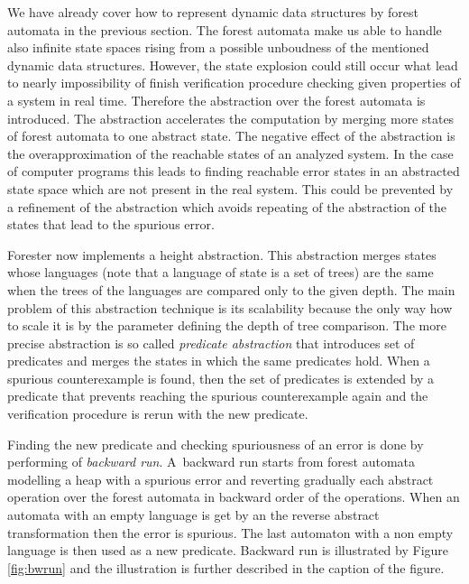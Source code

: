 \documentclass[fleqn,11pt]{ExcelAtFIT} %
\begin{document}
We have already cover how to represent dynamic data structures by forest automata in the previous section.
The forest automata make us able to handle also infinite state spaces
rising from a possible unboudness of the mentioned dynamic data structures.
However, the state explosion could still occur what lead
to nearly impossibility of finish verification procedure checking given properties of a system in real time.
Therefore the abstraction over the forest automata is introduced.
The abstraction accelerates the computation by merging more states
of forest automata to one abstract state.
The negative effect of the abstraction is the overapproximation of the reachable
states of an analyzed system.
In the case of computer programs this leads to finding reachable error states in
an abstracted state space which are not present in the real system.
This could be prevented by a refinement of the abstraction
which avoids repeating of the abstraction of the states
that lead to the spurious error.

Forester now implements a height abstraction.
This abstraction merges states whose languages (note that a language of state is a set of trees) are the same
when the trees of the languages are compared only to the given depth.
The main problem of this abstraction technique is its scalability because
the only way how to scale it is by the parameter defining the depth of tree comparison.
The more precise abstraction is so called \emph{predicate abstraction} that introduces
set of predicates and merges the states in which the same predicates hold.
When a spurious counterexample is found, then the set of predicates is extended by
a predicate that prevents reaching the spurious counterexample again
and the verification procedure is rerun with the new predicate.

Finding the new predicate and checking spuriousness of an error is done by performing of \emph{backward run}.
A~backward run starts from forest automata modelling a heap with a spurious error and
reverting gradually each abstract operation over the forest automata
in backward order of the operations.
When an automata with an empty language is get by an the reverse abstract transformation then the error is spurious.
The last automaton with a non empty language is then used as a new predicate.
Backward run is illustrated by Figure \ref{fig:bwrun} and the illustration
is further described in the caption of the figure.
\end{document}
